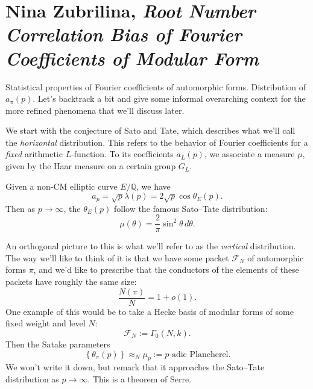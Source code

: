 \documentclass[reqno]{amsart} 
\begin{document}
\section{Nina Zubrilina, \emph{Root Number Correlation Bias of Fourier Coefficients of Modular Form}}
Statistical properties of Fourier coefficients of automorphic forms.  Distribution of $a_\pi (p)$.  Let's backtrack a bit and give some informal overarching context for the more refined phenomena that we'll discuss later.

We start with the conjecture of Sato and Tate, which describes what we'll call the \emph{horizontal } distribution.  This refers to the behavior of Fourier coefficients for a \emph{fixed} arithmetic $L$-function.  To its coefficients $a_L (p)$, we associate a measure $\mu$, given by the Haar measure on a certain group $G_L$.
\begin{example}
  Given a non-CM elliptic curve $E/\mathbb{Q}$, we have
  \begin{equation*}
    a_p = \sqrt{p} \lambda (p)
    = 2 \sqrt{p} \cos \theta_E (p).
  \end{equation*}
  Then as $p \rightarrow \infty$, the $\theta_E (p)$ follow the famous Sato--Tate distribution:
  \begin{equation*}
    \mu (\theta) = \frac{2}{ \pi } \sin^2 \theta \, d \theta .
  \end{equation*}
\end{example}

An orthogonal picture to this is what we'll refer to as the \emph{vertical} distribution.  The way we'll like to think of it is that we have some packet $\mathcal{F}_N $ of automorphic forms $\pi$, and we'd like to prescribe that the conductors of the elements of these packets have roughly the same size:
\begin{equation*}
  \frac{N (\pi) }{N} = 1 + o(1).
\end{equation*}
One example of this would be to take a Hecke basis of modular forms of some fixed weight and level $N$:
\begin{equation*}
  \mathcal{F}_N := \Gamma_0(N,k).
\end{equation*}
Then the Satake parameters
\begin{equation*}
  \left\{ \theta_\pi (p)  \right\} \approx_N
  \mu_p := \text{$p$-adic Plancherel}.
\end{equation*}
We won't write it down, but remark that it approaches the Sato--Tate distribution as $p \rightarrow \infty $.  This is a theorem of Serre.
\end{document}

